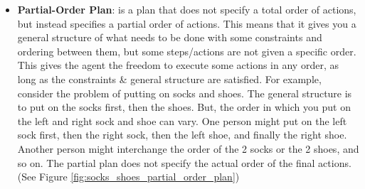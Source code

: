 \begin{itemize}
    \item \label{def:partial_order_plan}
          \textbf{Partial-Order Plan}: is a plan that does not specify a total order of actions, but instead specifies a partial order of actions. This means that it gives you a general structure of what needs to be done with some constraints and ordering between them, but some steps/actions are not given a specific order. This gives the agent the freedom to execute some actions in any order, as long as the constraints \& general structure are satisfied. For example, consider the problem of putting on socks and shoes. The general structure is to put on the socks first, then the shoes. But, the order in which you put on the left and right sock and shoe can vary. One person might put on the left sock first, then the right sock, then the left shoe, and finally the right shoe. Another person might interchange the order of the 2 socks or the 2 shoes, and so on. The partial plan does not specify the actual order of the final actions. (See Figure \ref{fig:socks_shoes_partial_order_plan})

          \begin{figure}[ht]
              \centering
\end{figure}
\end{itemize}
